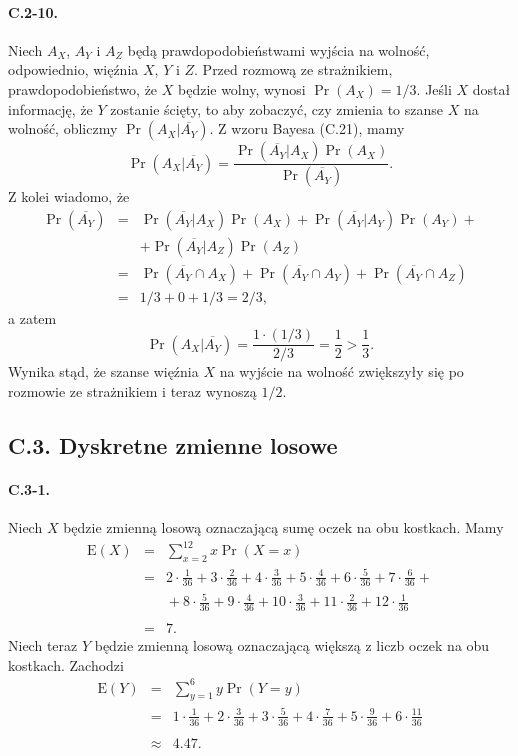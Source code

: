 \paragraph{C.2-10.}
Niech $A_X$, $A_Y$ i $A_Z$ będą prawdopodobieństwami wyjścia na wolność, odpowiednio, więźnia $X$, $Y$ i $Z$. Przed rozmową ze strażnikiem, prawdopodobieństwo, że $X$ będzie wolny, wynosi $\Pr\left(A_X\right)=1/3$. Jeśli $X$ dostał informację, że $Y$ zostanie ścięty, to aby zobaczyć, czy zmienia to szanse $X$ na wolność, obliczmy $\Pr\left(A_X|\overline{A_Y}\right)$. Z wzoru Bayesa (C.21), mamy
\[
	\Pr\left(A_X|\overline{A_Y}\right) = \frac{\Pr\left(\overline{A_Y}|A_X\right)\Pr\left(A_X\right)}{\Pr\left(\overline{A_Y}\right)}.
\]
Z kolei wiadomo, że
\begin{eqnarray*}
	\Pr\left(\overline{A_Y}\right) &=& \Pr\left(\overline{A_Y}|A_X\right)\Pr\left(A_X\right)+\Pr\left(\overline{A_Y}|A_Y\right)\Pr\left(A_Y\right)+{}\nonumber \\
	&& +{}\Pr\left(\overline{A_Y}|A_Z\right)\Pr\left(A_Z\right) \\
	&=& \Pr\left(\overline{A_Y}\cap A_X\right)+\Pr\left(\overline{A_Y}\cap A_Y\right)+\Pr\left(\overline{A_Y}\cap A_Z\right) \\
	&=& 1/3+0+1/3 = 2/3,
\end{eqnarray*}
a zatem
\[
	\Pr\left(A_X|\overline{A_Y}\right) = \frac{1\cdot (1/3)}{2/3} = \frac{1}{2}>\frac{1}{3}.
\]
Wynika stąd, że szanse więźnia $X$ na wyjście na wolność zwiększyły się po rozmowie ze strażnikiem i teraz wynoszą $1/2$.

\subsection*{C.3. Dyskretne zmienne losowe}

\paragraph{C.3-1.}
Niech $X$ będzie zmienną losową oznaczającą sumę oczek na obu kostkach. Mamy
\begin{eqnarray*}
	\mathrm{E}(X) &=& \sum_{x=2}^{12}x\Pr(X=x) \\
	&=& 2\cdot\frac{1}{36}+3\cdot\frac{2}{36}+4\cdot\frac{3}{36}+5\cdot\frac{4}{36}+6\cdot\frac{5}{36}+7\cdot\frac{6}{36}+{}\nonumber \\
	&& {}+8\cdot\frac{5}{36}+9\cdot\frac{4}{36}+10\cdot\frac{3}{36}+11\cdot\frac{2}{36}+12\cdot\frac{1}{36} \\\\
	&=& 7.
\end{eqnarray*}
Niech teraz $Y$ będzie zmienną losową oznaczającą większą z liczb oczek na obu kostkach. Zachodzi
\begin{eqnarray*}
	\mathrm{E}(Y) &=& \sum_{y=1}^{6}y\Pr(Y=y) \\
	&=& 1\cdot\frac{1}{36}+2\cdot\frac{3}{36}+3\cdot\frac{5}{36}+4\cdot\frac{7}{36}+5\cdot\frac{9}{36}+6\cdot\frac{11}{36} \\\\
	&\approx& 4.47.
\end{eqnarray*}

